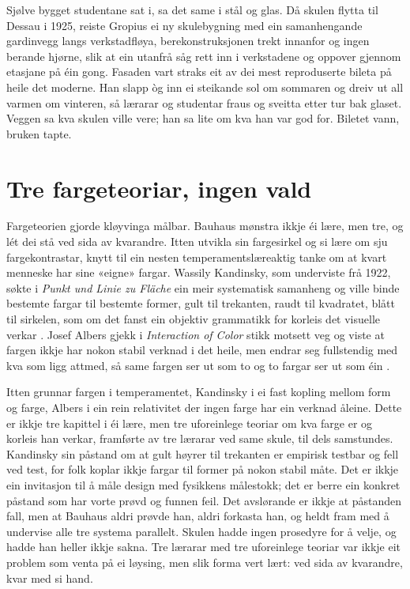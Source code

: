 Sjølve bygget studentane sat i, sa det same i stål og glas. Då skulen flytta til Dessau i 1925, reiste Gropius ei ny skulebygning med ein samanhengande gardinvegg langs verkstadfløya, berekonstruksjonen trekt innanfor og ingen berande hjørne, slik at ein utanfrå såg rett inn i verkstadene og oppover gjennom etasjane på éin gong. Fasaden vart straks eit av dei mest reproduserte bileta på heile det moderne. Han slapp òg inn ei steikande sol om sommaren og dreiv ut all varmen om vinteren, så lærarar og studentar fraus og sveitta etter tur bak glaset. Veggen sa kva skulen ville vere; han sa lite om kva han var god for. Biletet vann, bruken tapte.

\section{Tre fargeteoriar, ingen vald}

Fargeteorien gjorde kløyvinga målbar. Bauhaus mønstra ikkje éi lære, men tre, og lét dei stå ved sida av kvarandre. Itten utvikla sin fargesirkel og si lære om sju fargekontrastar, knytt til ein nesten temperamentslæreaktig tanke om at kvart menneske har sine «eigne» fargar. Wassily Kandinsky, som underviste frå 1922, søkte i \textit{Punkt und Linie zu Fläche} ein meir systematisk samanheng og ville binde bestemte fargar til bestemte former, gult til trekanten, raudt til kvadratet, blått til sirkelen, som om det fanst ein objektiv grammatikk for korleis det visuelle verkar \autocite{kandinsky1926}. Josef Albers gjekk i \textit{Interaction of Color} stikk motsett veg og viste at fargen ikkje har nokon stabil verknad i det heile, men endrar seg fullstendig med kva som ligg attmed, så same fargen ser ut som to og to fargar ser ut som éin \autocite{albers1963}.

Itten grunnar fargen i temperamentet, Kandinsky i ei fast kopling mellom form og farge, Albers i ein rein relativitet der ingen farge har ein verknad åleine. Dette er ikkje tre kapittel i éi lære, men tre uforeinlege teoriar om kva farge er og korleis han verkar, framførte av tre lærarar ved same skule, til dels samstundes. Kandinsky sin påstand om at gult høyrer til trekanten er empirisk testbar og fell ved test, for folk koplar ikkje fargar til former på nokon stabil måte. Det er ikkje ein invitasjon til å måle design med fysikkens målestokk; det er berre ein konkret påstand som har vorte prøvd og funnen feil. Det avslørande er ikkje at påstanden fall, men at Bauhaus aldri prøvde han, aldri forkasta han, og heldt fram med å undervise alle tre systema parallelt. Skulen hadde ingen prosedyre for å velje, og hadde han heller ikkje sakna. Tre lærarar med tre uforeinlege teoriar var ikkje eit problem som venta på ei løysing, men slik forma vert lært: ved sida av kvarandre, kvar med si hand.


